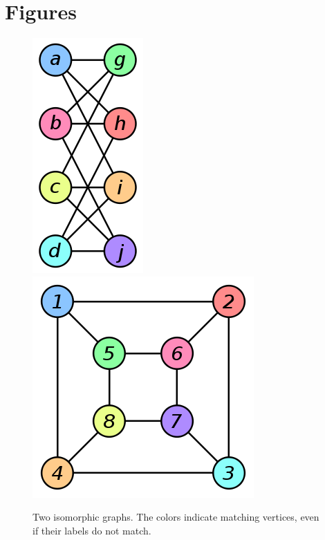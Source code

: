 \documentclass[letterpaper, 12pt]{article}
\begin{document}
\section{Figures}
\begin{figure}[p]
    \label{graph-iso-image-figure}
    \caption{Two isomorphic graphs. The colors indicate matching vertices, even
    if their labels do not match. ~\cite{wikimedia-images}}
    \centering
    \includegraphics[scale=0.4]{graph-iso-a}
    \includegraphics[scale=0.4]{graph-iso-b}
\end{figure}

{}

\end{document}
